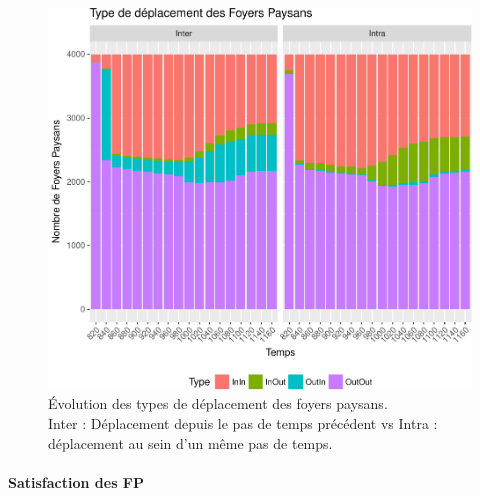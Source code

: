 \begin{figure}[H]
	\captionsetup{width=\linewidth}
	\includegraphics[width=\linewidth]{img/resultats/v0_types_deplacements.pdf}
	\caption{Évolution des types de déplacement des foyers paysans.\\
		Inter : Déplacement depuis le pas de temps précédent vs Intra :
déplacement au sein d'un même pas de temps.
		\\
} 
	\label{fig:type-deplacements-v0} 
\end{figure}



\paragraph{Satisfaction des FP}

